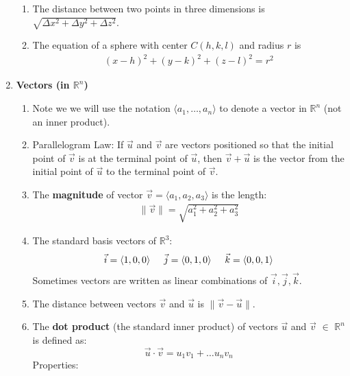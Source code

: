 \documentclass[10pt]{article}
\begin{document}
\begin{multicols*}{2}
\begin{enumerate}
\begin{enumerate}
        
        \item The distance between two points in three dimensions is $\sqrt{\Delta x^2 + \Delta y^2 + \Delta z^2}$.
        \item The equation of a sphere with center $C(h,k,l)$ and radius $r$ is 
        \begin{align*}
            (x-h)^2 + (y-k)^2 + (z-l)^2 = r^2
        \end{align*}
    \end{enumerate}
    \item \textbf{Vectors (in $\mathbb{R}^n$)}
    \begin{enumerate}
        \item Note we we will use the notation $\langle a_1, \hdots, a_n \rangle$ to denote a vector in $\mathbb{R}^n$ (not an inner product).
        \item Parallelogram Law: If $\vec{u}$ and $\vec{v}$ are vectors positioned so that the initial point of $\vec{v}$ is at the terminal point of $\vec{u}$, then $\vec{v} + \vec{u}$ is the vector from the initial point of $\vec{u}$ to the terminal point of $\vec{v}$.
        \item The \textbf{magnitude} of vector $\vec{v} = \langle a_1, a_2, a_3 \rangle$ is the length: 
        \begin{align*}
            \| \vec{v} \| = \sqrt{a_1^2 + a_2^2 + a_3^2}
        \end{align*}
        \item The standard basis vectors of $\mathbb{R}^3$:
        \begin{align*}
            \vec{i} = \langle 1,0,0 \rangle \hspace{5mm} 
            \vec{j} = \langle 0,1,0 \rangle \hspace{5mm} 
            \vec{k} = \langle 0,0,1 \rangle 
        \end{align*}
        Sometimes vectors are written as linear combinations of $\vec{i},\vec{j},\vec{k}$.
        \item The distance between vectors $\vec{v}$ and $\vec{u}$ is $\| \vec{v} - \vec{u} \|$.
    \item The \textbf{dot product} (the standard inner product) of vectors $\vec{u}$ and $\vec{v}$ $\in$ $\mathbb{R}^n$ is defined as:
    \begin{equation*}
       \vec{u} \cdot \vec{v} = u_1v_1+\ldots u_nv_n
    \end{equation*}
    Properties:
    \begin{align*}

\end{align*}
\end{enumerate}
\end{enumerate}
\end{multicols*}
\end{document}
